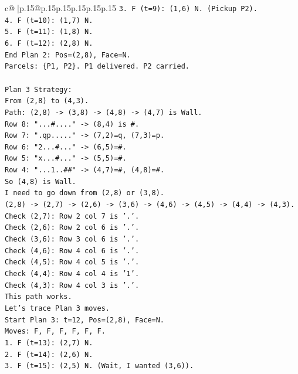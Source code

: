 \documentclass{article}
\begin{document}
{\begin{supertabular}{c@{$\;$}|p{.15\linewidth}@{}p{.15\linewidth}p{.15\linewidth}p{.15\linewidth}p{.15\linewidth}p{.15\linewidth}}
{{{\texttt{3. F (t=9): (1,6) N. (Pickup P2).} \\
\texttt{4. F (t=10): (1,7) N.} \\
\texttt{5. F (t=11): (1,8) N.} \\
\texttt{6. F (t=12): (2,8) N.} \\
\texttt{End Plan 2: Pos=(2,8), Face=N.} \\
\texttt{Parcels: \{P1, P2\}. P1 delivered. P2 carried.} \\
\\ 
\texttt{Plan 3 Strategy:} \\
\texttt{From (2,8) to (4,3).} \\
\texttt{Path: (2,8) {-}> (3,8) {-}> (4,8) {-}> (4,7) is Wall.} \\
\texttt{Row 8: "...\#...." {-}> (8,4) is \#.} \\
\texttt{Row 7: ".qp....." {-}> (7,2)=q, (7,3)=p.} \\
\texttt{Row 6: "2...\#..." {-}> (6,5)=\#.} \\
\texttt{Row 5: "x...\#..." {-}> (5,5)=\#.} \\
\texttt{Row 4: "...1..\#\#" {-}> (4,7)=\#, (4,8)=\#.} \\
\texttt{So (4,8) is Wall.} \\
\texttt{I need to go down from (2,8) or (3,8).} \\
\texttt{(2,8) {-}> (2,7) {-}> (2,6) {-}> (3,6) {-}> (4,6) {-}> (4,5) {-}> (4,4) {-}> (4,3).} \\
\texttt{Check (2,7): Row 2 col 7 is '.'.} \\
\texttt{Check (2,6): Row 2 col 6 is '.'.} \\
\texttt{Check (3,6): Row 3 col 6 is '.'.} \\
\texttt{Check (4,6): Row 4 col 6 is '.'.} \\
\texttt{Check (4,5): Row 4 col 5 is '.'.} \\
\texttt{Check (4,4): Row 4 col 4 is '1'.} \\
\texttt{Check (4,3): Row 4 col 3 is '.'.} \\
\texttt{This path works.} \\
\texttt{Let's trace Plan 3 moves.} \\
\texttt{Start Plan 3: t=12, Pos=(2,8), Face=N.} \\
\texttt{Moves: F, F, F, F, F, F.} \\
\texttt{1. F (t=13): (2,7) N.} \\
\texttt{2. F (t=14): (2,6) N.} \\
\texttt{3. F (t=15): (2,5) N. (Wait, I wanted (3,6)).} \\
}}}
\end{supertabular}}
\end{document}
